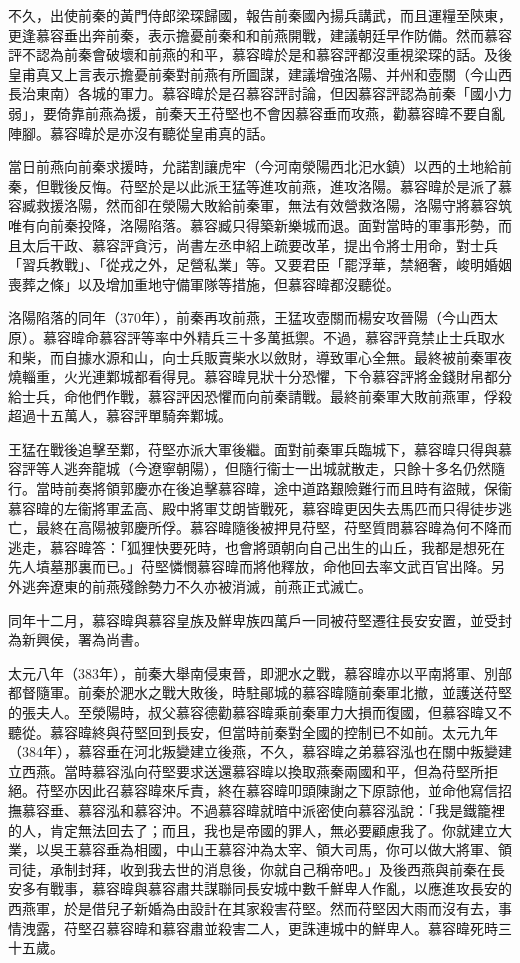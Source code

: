 不久，出使前秦的黃門侍郎梁琛歸國，報告前秦國內揚兵講武，而且運糧至陝東，更逢慕容垂出奔前秦，表示擔憂前秦和和前燕開戰，建議朝廷早作防備。然而慕容評不認為前秦會破壞和前燕的和平，慕容暐於是和慕容評都沒重視梁琛的話。及後皇甫真又上言表示擔憂前秦對前燕有所圖謀，建議增強洛陽、并州和壺關（今山西長治東南）各城的軍力。慕容暐於是召慕容評討論，但因慕容評認為前秦「國小力弱」，要倚靠前燕為援，前秦天王苻堅也不會因慕容垂而攻燕，勸慕容暐不要自亂陣腳。慕容暐於是亦沒有聽從皇甫真的話。

當日前燕向前秦求援時，允諾割讓虎牢（今河南滎陽西北汜水鎮）以西的土地給前秦，但戰後反悔。苻堅於是以此派王猛等進攻前燕，進攻洛陽。慕容暐於是派了慕容臧救援洛陽，然而卻在滎陽大敗給前秦軍，無法有效營救洛陽，洛陽守將慕容筑唯有向前秦投降，洛陽陷落。慕容臧只得築新樂城而退。面對當時的軍事形勢，而且太后干政、慕容評貪污，尚書左丞申紹上疏要改革，提出令將士用命，對士兵「習兵教戰」、「從戎之外，足營私業」等。又要君臣「罷浮華，禁絕奢，峻明婚姻喪葬之條」以及增加重地守備軍隊等措施，但慕容暐都沒聽從。

洛陽陷落的同年（370年），前秦再攻前燕，王猛攻壺關而楊安攻晉陽（今山西太原）。慕容暐命慕容評等率中外精兵三十多萬抵禦。不過，慕容評竟禁止士兵取水和柴，而自據水源和山，向士兵販賣柴水以斂財，導致軍心全無。最終被前秦軍夜燒輜重，火光連鄴城都看得見。慕容暐見狀十分恐懼，下令慕容評將金錢財帛都分給士兵，命他們作戰，慕容評因恐懼而向前秦請戰。最終前秦軍大敗前燕軍，俘殺超過十五萬人，慕容評單騎奔鄴城。

王猛在戰後追擊至鄴，苻堅亦派大軍後繼。面對前秦軍兵臨城下，慕容暐只得與慕容評等人逃奔龍城（今遼寧朝陽），但隨行衞士一出城就散走，只餘十多名仍然隨行。當時前奏將領郭慶亦在後追擊慕容暐，途中道路艱險難行而且時有盜賊，保衞慕容暐的左衞將軍孟高、殿中將軍艾朗皆戰死，慕容暐更因失去馬匹而只得徒步逃亡，最終在高陽被郭慶所俘。慕容暐隨後被押見苻堅，苻堅質問慕容暐為何不降而逃走，慕容暐答：「狐狸快要死時，也會將頭朝向自己出生的山丘，我都是想死在先人墳墓那裏而已。」苻堅憐憫慕容暐而將他釋放，命他回去率文武百官出降。另外逃奔遼東的前燕殘餘勢力不久亦被消滅，前燕正式滅亡。

同年十二月，慕容暐與慕容皇族及鮮卑族四萬戶一同被苻堅遷往長安安置，並受封為新興侯，署為尚書。

太元八年（383年），前秦大舉南侵東晉，即淝水之戰，慕容暐亦以平南將軍、別部都督隨軍。前秦於淝水之戰大敗後，時駐鄖城的慕容暐隨前秦軍北撤，並護送苻堅的張夫人。至滎陽時，叔父慕容德勸慕容暐乘前秦軍力大損而復國，但慕容暐又不聽從。慕容暐終與苻堅回到長安，但當時前秦對全國的控制已不如前。太元九年（384年），慕容垂在河北叛變建立後燕，不久，慕容暐之弟慕容泓也在關中叛變建立西燕。當時慕容泓向苻堅要求送還慕容暐以換取燕秦兩國和平，但為苻堅所拒絕。苻堅亦因此召慕容暐來斥責，終在慕容暐叩頭陳謝之下原諒他，並命他寫信招撫慕容垂、慕容泓和慕容沖。不過慕容暐就暗中派密使向慕容泓說：「我是鐵籠裡的人，肯定無法回去了；而且，我也是帝國的罪人，無必要顧慮我了。你就建立大業，以吳王慕容垂為相國，中山王慕容沖為太宰、領大司馬，你可以做大將軍、領司徒，承制封拜，收到我去世的消息後，你就自己稱帝吧。」及後西燕與前秦在長安多有戰事，慕容暐與慕容肅共謀聯同長安城中數千鮮卑人作亂，以應進攻長安的西燕軍，於是借兒子新婚為由設計在其家殺害苻堅。然而苻堅因大雨而沒有去，事情洩露，苻堅召慕容暐和慕容肅並殺害二人，更誅連城中的鮮卑人。慕容暐死時三十五歲。

